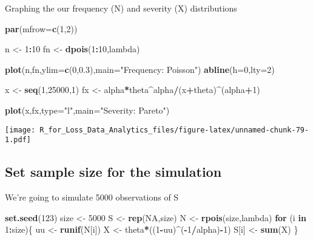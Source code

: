 \documentclass[]{book}
\newenvironment{Shaded}{\begin{snugshade}}{\end{snugshade}}
\newcommand{\KeywordTok}[1]{\textcolor[rgb]{0.13,0.29,0.53}{\textbf{#1}}}
\newcommand{\DataTypeTok}[1]{\textcolor[rgb]{0.13,0.29,0.53}{#1}}
\newcommand{\DecValTok}[1]{\textcolor[rgb]{0.00,0.00,0.81}{#1}}
\newcommand{\FloatTok}[1]{\textcolor[rgb]{0.00,0.00,0.81}{#1}}
\newcommand{\StringTok}[1]{\textcolor[rgb]{0.31,0.60,0.02}{#1}}
\newcommand{\OtherTok}[1]{\textcolor[rgb]{0.56,0.35,0.01}{#1}}
\newcommand{\ControlFlowTok}[1]{\textcolor[rgb]{0.13,0.29,0.53}{\textbf{#1}}}
\newcommand{\OperatorTok}[1]{\textcolor[rgb]{0.81,0.36,0.00}{\textbf{#1}}}
\newcommand{\NormalTok}[1]{#1}
\theoremstyle{definition}
\theoremstyle{definition}
\theoremstyle{definition}
\theoremstyle{remark}
\begin{document}
Graphing the our frequency (N) and severity (X) distributions

\begin{Shaded}
\begin{Highlighting}[]
\KeywordTok{par}\NormalTok{(}\DataTypeTok{mfrow=}\KeywordTok{c}\NormalTok{(}\DecValTok{1}\NormalTok{,}\DecValTok{2}\NormalTok{))}

\NormalTok{n <-}\StringTok{ }\DecValTok{1}\OperatorTok{:}\DecValTok{10}
\NormalTok{fn <-}\StringTok{ }\KeywordTok{dpois}\NormalTok{(}\DecValTok{1}\OperatorTok{:}\DecValTok{10}\NormalTok{,lambda)}

\KeywordTok{plot}\NormalTok{(n,fn,}\DataTypeTok{ylim=}\KeywordTok{c}\NormalTok{(}\DecValTok{0}\NormalTok{,}\FloatTok{0.3}\NormalTok{),}\DataTypeTok{main=}\StringTok{"Frequency: Poisson"}\NormalTok{)}
\KeywordTok{abline}\NormalTok{(}\DataTypeTok{h=}\DecValTok{0}\NormalTok{,}\DataTypeTok{lty=}\DecValTok{2}\NormalTok{)}

\NormalTok{x <-}\StringTok{ }\KeywordTok{seq}\NormalTok{(}\DecValTok{1}\NormalTok{,}\DecValTok{25000}\NormalTok{,}\DecValTok{1}\NormalTok{)}
\NormalTok{fx <-}\StringTok{ }\NormalTok{alpha}\OperatorTok{*}\NormalTok{theta}\OperatorTok{^}\NormalTok{alpha}\OperatorTok{/}\NormalTok{(x}\OperatorTok{+}\NormalTok{theta)}\OperatorTok{^}\NormalTok{(alpha}\OperatorTok{+}\DecValTok{1}\NormalTok{)}

\KeywordTok{plot}\NormalTok{(x,fx,}\DataTypeTok{type=}\StringTok{"l"}\NormalTok{,}\DataTypeTok{main=}\StringTok{"Severity: Pareto"}\NormalTok{)}
\end{Highlighting}
\end{Shaded}

\texttt{[image: R\_for\_Loss\_Data\_Analytics\_files/figure-latex/unnamed-chunk-79-1.pdf]}

\subsection{Set sample size for the
simulation}\label{set-sample-size-for-the-simulation}

We're going to simulate 5000 observations of S

\begin{Shaded}
\begin{Highlighting}[]
\KeywordTok{set.seed}\NormalTok{(}\DecValTok{123}\NormalTok{)}
\NormalTok{size <-}\StringTok{ }\DecValTok{5000}
\NormalTok{S <-}\StringTok{ }\KeywordTok{rep}\NormalTok{(}\OtherTok{NA}\NormalTok{,size)}
\NormalTok{N <-}\StringTok{ }\KeywordTok{rpois}\NormalTok{(size,lambda)}
\ControlFlowTok{for}\NormalTok{ (i }\ControlFlowTok{in} \DecValTok{1}\OperatorTok{:}\NormalTok{size)\{}
\NormalTok{  uu <-}\StringTok{ }\KeywordTok{runif}\NormalTok{(N[i])}
\NormalTok{  X <-}\StringTok{ }\NormalTok{theta}\OperatorTok{*}\NormalTok{((}\DecValTok{1}\OperatorTok{-}\NormalTok{uu)}\OperatorTok{^}\NormalTok{(}\OperatorTok{-}\DecValTok{1}\OperatorTok{/}\NormalTok{alpha)}\OperatorTok{-}\DecValTok{1}\NormalTok{)}
\NormalTok{  S[i] <-}\StringTok{ }\KeywordTok{sum}\NormalTok{(X)}
\NormalTok{\}}
\end{Highlighting}
\end{Shaded}
\end{document}

